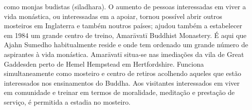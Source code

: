 como monjas budistas (siladhara). O aumento de pessoas
interessadas em viver a vida monástica, ou interessadas em a
apoiar, tornou possível abrir outros mosteiros em Inglaterra e
também noutros países; ajudou também a estabelecer em
1984 um grande centro de treino, Amarāvatī Buddhist
Monastery. É aqui que Ajahn Sumedho habitualmente reside
e onde tem ordenado um grande número de aspirantes à vida
monástica.
Amarāvatī situa-se nas imediações da vila de Great
Gaddesden perto de Hemel Hempstead em Hertfordshire.
Funciona simultaneamente como mosteiro e centro de retiros
acolhendo aqueles que estão interessados nos ensinamentos
do Buddha. Aos visitantes interessados em viver em comunidade e treinar em termos de moralidade, meditação e prestação de serviço, é permitida a estadia no mosteiro.